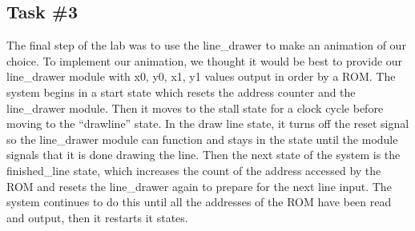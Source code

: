 \documentclass[11pt, titlepage]{article}
\begin{document}
        \subsection{Task \#3}
            The final step of the lab was to use the line\_drawer to make an animation of our choice. To implement our animation, we thought it would be best to provide our line\_drawer module with x0, y0, x1, y1 values output in order by a ROM. The system begins in a start state which resets the address counter and the line\_drawer module. Then it moves to the stall state for a clock cycle before moving to the “drawline” state. In the draw line state, it turns off the reset signal so the line\_drawer module can function and stays in the state until the module signals that it is done drawing the line. Then the next state of the system is the finished\_line state, which increases the count of the address accessed by the ROM and resets the line\_drawer again to prepare for the next line input. The system continues to do this until all the addresses of the ROM have been read and output, then it restarts it states.
\end{document}
